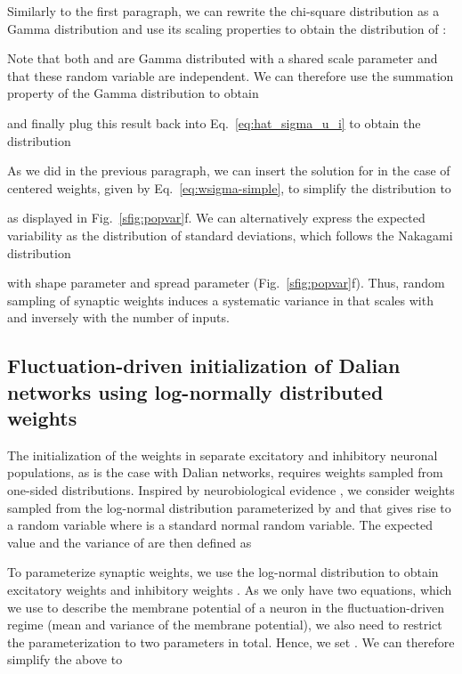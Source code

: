 \documentclass[11pt,a4paper]{article}
\begin{document}
\begin{refsection}
Similarly to the first paragraph, we can rewrite the chi-square distribution as a Gamma distribution and use its scaling properties to obtain the distribution of :

Note that both  and  are Gamma distributed with a shared scale parameter  and that these random variable are independent. We can therefore use the summation property of the Gamma distribution to obtain

and finally plug this result back into Eq.~\eqref{eq:hat_sigma_u_i} to obtain the distribution

As we did in the previous paragraph, we can insert the solution for  in the case of centered weights, given by Eq.~\eqref{eq:wsigma-simple}, to simplify the distribution to

as displayed in Fig.~\ref{sfig:popvar}f.
We can alternatively express the expected variability as the distribution of standard deviations, which follows the Nakagami distribution \citep{Huang2016}

with shape parameter  and spread parameter  (Fig.~\ref{sfig:popvar}f). 
Thus, random sampling of synaptic weights induces a systematic variance in  that scales with  and inversely with the number of inputs.


\clearpage


\subsection{Fluctuation-driven initialization of Dalian networks using log-normally distributed weights}
\label{sec:lognormal}

The initialization of the weights in separate excitatory and inhibitory neuronal populations, as is the case with Dalian networks, requires weights sampled from one-sided distributions. 
Inspired by neurobiological evidence \citep{buzsaki_log-dynamic_2014}, we consider weights sampled from the log-normal distribution parameterized by  and  that gives rise to a random variable  where  is a standard normal random variable. The expected value and the variance of  are then defined as

    
To parameterize synaptic weights, we use the log-normal distribution to obtain excitatory weights  and inhibitory weights . As we only have two equations, which we use to describe the membrane potential of a neuron in the fluctuation-driven regime (mean and variance of the membrane potential), we also need to restrict the parameterization to two parameters in total. Hence, we set . We can therefore simplify the above to


\end{refsection}
\end{document}
